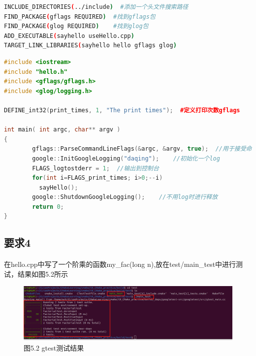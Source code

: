 \documentclass[40pt,a4paper，UTF8]{ctexart}
\begin{document}
\begin{lstlisting}[language=bash, caption=main/CMakeLists.txt]
INCLUDE_DIRECTORIES(../include)  #添加一个头文件搜索路径
FIND_PACKAGE(gflags REQUIRED)  #找到gflags包
FIND_PACKAGE(glog REQUIRED)    #找到glog包
ADD_EXECUTABLE(sayhello useHello.cpp)
TARGET_LINK_LIBRARIES(sayhello hello gflags glog) 
\end{lstlisting}

\begin{lstlisting}[language=C++, caption=main/main.cpp]
#include <iostream>
#include "hello.h"
#include <gflags/gflags.h>
#include <glog/logging.h>

DEFINE_int32(print_times, 1, "The print times");  #定义打印次数gflags

int main( int argc, char** argv )
{
        gflags::ParseCommandLineFlags(&argc, &argv, true);  //用于接受命令行的flag参数并更新默认参数
        google::InitGoogleLogging("daqing");    //初始化一个log
        FLAGS_logtostderr = 1;  //输出到控制台
        for(int i=FLAGS_print_times; i>0;--i)
          sayHello();
        google::ShutdownGoogleLogging();    //不用log时进行释放
        return 0;
}
\end{lstlisting}

\paragraph{}

\subsection{要求4} 
\paragraph{}

在hello.cpp中写了一个阶乘的函数my\_fac(long n),放在test/main\_test中进行测试，结果如图5.2所示

\begin{figure}[H]
\centering
\includegraphics[width=4.8in]{ch1_5_2.png} {图5.2 gtest测试结果}
\end{figure}
\end{document}
